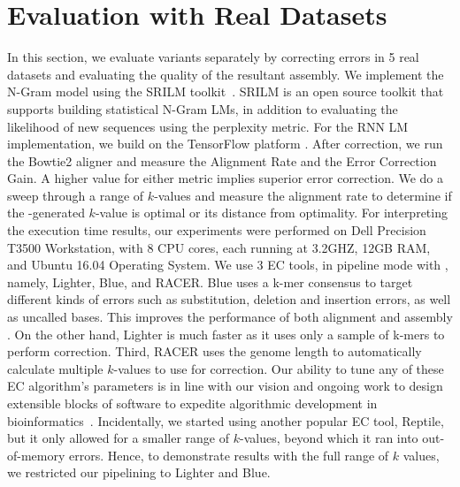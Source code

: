 \vspace{-5pt}
\section{Evaluation with Real Datasets}
\label{sec:evaluation-real}

In this section, we evaluate \name variants separately by correcting errors in 5 real datasets and evaluating the quality of the resultant assembly. We implement the N-Gram model using the SRILM toolkit~\cite{Stolcke02srilm--}. SRILM is an open source toolkit that supports building statistical N-Gram LMs, in addition to evaluating the likelihood of new sequences using the perplexity metric. For the RNN LM implementation, we build on the TensorFlow platform \cite{45381}.
After correction, we run the Bowtie2 aligner \cite{langmead2012fast} and measure the Alignment Rate and the Error Correction Gain. A higher value for either metric implies superior error correction.
We do a sweep through a range of $k$-values and measure the alignment rate to determine if the \name-generated $k$-value is optimal or its distance from optimality. For interpreting the execution time results, our experiments were performed on Dell Precision T3500 Workstation, with 8 CPU cores, each running at 3.2GHZ, 12GB RAM, and Ubuntu 16.04 Operating System.
We use 3 EC tools, in pipeline mode with \name, namely, Lighter, Blue, and RACER. Blue uses a k-mer consensus to target different kinds of errors such as substitution, deletion and insertion errors, as well as uncalled bases. This improves the performance of both alignment and assembly \cite{greenfield2014blue}. On the other hand, Lighter is much faster as it uses only a sample of k-mers to perform correction. %
Third, RACER uses the genome length to automatically calculate multiple $k$-values to use for correction.
Our ability to tune any of these EC algorithm's parameters is in line with our vision and ongoing work to design extensible blocks of software to expedite algorithmic development in bioinformatics~\cite{mahadik2016sarvavid}.
Incidentally, we started using another popular EC tool, Reptile, but it only allowed for a smaller range of $k$-values, beyond which it ran into out-of-memory errors. Hence, to demonstrate results with the full range of $k$ values, we restricted our pipelining to Lighter and Blue. 

